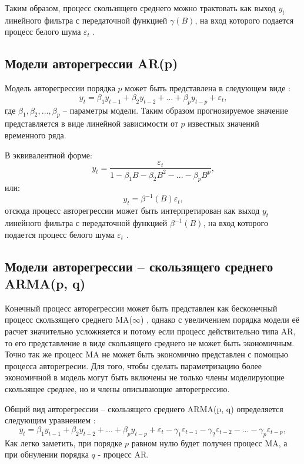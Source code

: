 \documentclass[a4paper,14pt,russian]{extreport}
\begin{document}
Таким образом, процесс скользящего среднего можно трактовать как выход 
$y_t$ линейного фильтра с передаточной функцией $\gamma(B)$, на вход 
которого подается процесс белого шума $\varepsilon_t$ \cite{box2008}.


\subsection{Модели авторегрессии AR(p)}
Модель авторегрессии порядка $p$ может быть представлена в следующем 
виде \cite{runova2013}:
\begin{equation}
	y_t = \beta_1 y_{t-1} + \beta_2 y_{t-2} + ... + \beta_p y_{t-p} + \varepsilon_t \text{,} 
\end{equation}
где $\beta_1, \beta_2, ..., \beta_p$ -- параметры модели. Таким образом 
прогнозируемое значение представляется в виде линейной зависимости от $p$ 
известных значений временного ряда. 

В эквивалентной форме:
\begin{equation}
	y_t = \frac{\varepsilon_t}{1 - \beta_1 B - \beta_2 B^2 - ... - \beta_p B^p} \text{,} 
\end{equation}
или:
\begin{equation}
	y_t = \beta^{-1}(B)\varepsilon_t \text{,}
\end{equation}
отсюда процесс авторегрессии может быть интерпретирован как выход $y_t$ 
линейного фильтра с передаточной функцией $\beta^{-1}(B)$, на вход которого 
подается процесс белого шума $\varepsilon_t$ \cite{box2008}. 


\subsection{Модели авторегрессии -- скользящего среднего ARMA(p, q)}
Конечный процесс авторегрессии может быть представлен как бесконечный 
процесс скользящего среднего MA($\infty$) \cite{hamilton1994, chatfield2000}, 
однако с увеличением порядка модели её расчет значительно усложняется и 
потому если процесс действительно типа AR, то его представление в виде 
скользящего среднего не может быть экономичным. Точно так же процесс MA не 
может быть экономично представлен с помощью процесса авторегресии. Для 
того, чтобы сделать параметризацию более экономичной в модель могут быть 
включены не только члены моделирующие скользящее среднее, но и члены 
описывающие авторегрессию.

Общий вид авторегрессии -- скользящего среднего ARMA(p, q) определяется 
следующим уравнением \cite{runova2013}:
\begin{equation}
	y_t = \beta_1 y_{t-1} + \beta_2 y_{t-2} + ... + \beta_p y_{t-p} + \varepsilon_t 
		- \gamma_1 \varepsilon_{t-1} - \gamma_2 \varepsilon_{t-2}  - ... 
		- \gamma_p \varepsilon_{t-p}, 
\end{equation}
Как легко заметить, при порядке $p$ равном нулю будет получен процесс MA, 
а при обнулении порядка $q$ - процесс AR. 
\end{document}
